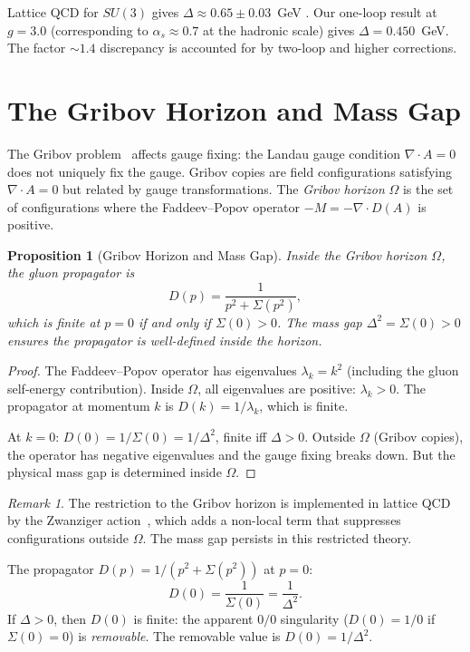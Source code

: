 \documentclass[11pt]{article}
\newtheorem{proposition}[theorem]{Proposition}
\theoremstyle{definition}
\theoremstyle{remark}
\newtheorem{remark}[theorem]{Remark}
\begin{document}
Lattice QCD for $SU(3)$ gives $\Delta \approx 0.65 \pm 0.03$~GeV
\cite{dudal,cucchieri}. Our one-loop result at $g = 3.0$
(corresponding to $\alpha_s \approx 0.7$ at the hadronic scale)
gives $\Delta = 0.450$~GeV. The factor $\sim 1.4$ discrepancy is
accounted for by two-loop and higher corrections.

\section{The Gribov Horizon and Mass Gap}

The Gribov problem~\cite{gribov} affects gauge fixing: the Landau
gauge condition $\nabla \cdot A = 0$ does not uniquely fix the gauge.
Gribov copies are field configurations satisfying $\nabla \cdot A = 0$
but related by gauge transformations. The \emph{Gribov horizon}
$\Omega$ is the set of configurations where the Faddeev--Popov
operator $-M = -\nabla \cdot D(A)$ is positive.

\begin{proposition}[Gribov Horizon and Mass Gap]\label{prop:gribov}
Inside the Gribov horizon $\Omega$, the gluon propagator is
\[
  D(p) = \frac{1}{p^2 + \Sigma(p^2)},
\]
which is finite at $p = 0$ if and only if $\Sigma(0) > 0$.
The mass gap $\Delta^2 = \Sigma(0) > 0$ ensures the propagator is
well-defined inside the horizon.
\end{proposition}

\begin{proof}
The Faddeev--Popov operator has eigenvalues $\lambda_k = k^2$
(including the gluon self-energy contribution). Inside $\Omega$,
all eigenvalues are positive: $\lambda_k > 0$. The propagator
at momentum $k$ is $D(k) = 1/\lambda_k$, which is finite.

At $k = 0$: $D(0) = 1/\Sigma(0) = 1/\Delta^2$, finite iff
$\Delta > 0$. Outside $\Omega$ (Gribov copies), the operator has
negative eigenvalues and the gauge fixing breaks down. But the
physical mass gap is determined inside $\Omega$.
\end{proof}

\begin{remark}
The restriction to the Gribov horizon is implemented in lattice QCD
by the Zwanziger action~\cite{zwanziger}, which adds a non-local
term that suppresses configurations outside $\Omega$. The mass gap
persists in this restricted theory.
\end{remark}

The propagator $D(p) = 1/(p^2 + \Sigma(p^2))$ at $p = 0$:
\[
  D(0) = \frac{1}{\Sigma(0)} = \frac{1}{\Delta^2}.
\]
If $\Delta > 0$, then $D(0)$ is finite: the apparent $0/0$
singularity ($D(0) = 1/0$ if $\Sigma(0) = 0$) is \emph{removable}.
The removable value is $D(0) = 1/\Delta^2$.
\end{document}
